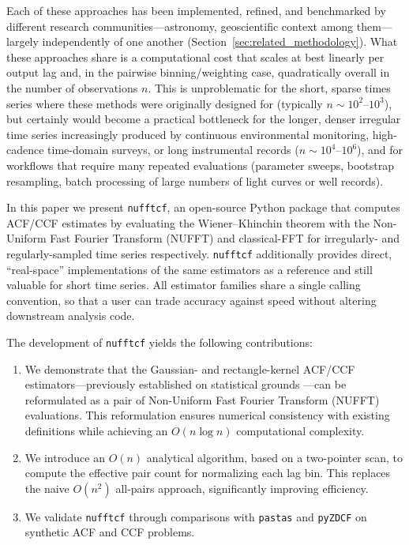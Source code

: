\documentclass[twocolumn,10pt]{article}
\newcommand{\nufftcf}{\texttt{nufftcf}\xspace}
\newcommand{\pastas}{\texttt{pastas}\xspace}
\newcommand{\pyzdcf}{\texttt{pyZDCF}\xspace}
\begin{document}
Each of these
approaches has been implemented, refined, and benchmarked by different
research communities---astronomy, geoscientific context  among
them---largely independently of one another (Section~\ref{sec:related_methodology}).
What these approaches share is a computational cost that scales at best
linearly per output lag and, in the pairwise binning/weighting case,
quadratically overall in the number of observations $n$. This is
unproblematic for the short, sparse times series where these
methods were originally designed for (typically $n \sim 10^2$--$10^3$),
but certainly would become a practical bottleneck for the longer, denser irregular time
series increasingly produced by continuous environmental monitoring,
high-cadence time-domain surveys, or long instrumental records
($n \sim 10^4$--$10^6$), and for workflows that require many repeated
evaluations (parameter sweeps, bootstrap resampling, batch processing of
large numbers of light curves or well records).

In this paper we present \nufftcf, an open-source Python package
that computes ACF/CCF estimates by evaluating the Wiener--Khinchin theorem with the
Non-Uniform Fast Fourier Transform (NUFFT) and classical-FFT for irregularly- and regularly-sampled time series respectively. \nufftcf additionally
provides direct, ``real-space'' implementations of the same estimators as
a reference and still valuable for short time series. All estimator families share a single
calling convention, so that a user can trade accuracy against speed
without altering downstream analysis code.

The development of \nufftcf yields the following contributions:
\begin{enumerate}
    \item We demonstrate that the Gaussian- and rectangle-kernel ACF/CCF estimators---previously established on statistical grounds \citep{Rehfeld2011}---can be reformulated as a pair of Non-Uniform Fast Fourier Transform (NUFFT) evaluations. This reformulation ensures numerical consistency with existing definitions while achieving an $O(n \log n)$ computational complexity.
    \item We introduce an $O(n)$ analytical algorithm, based on a two-pointer scan, to compute the effective pair count for normalizing each lag bin. This replaces the naive $O(n^2)$ all-pairs approach, significantly improving efficiency.
    \item We validate \nufftcf through comparisons with \pastas \citep{collenteur2019} and \pyzdcf \citep{jankov2022pyzdcf} on synthetic ACF and CCF problems.
\end{enumerate}
\end{document}
